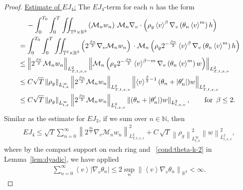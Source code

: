 \documentclass[11pt,american, reqno]{amsart}
\numberwithin{equation}{section}
\newcommand{\N}{\mathbb N}
\newcommand{\R}{\mathbb R}
\newcommand{\1}{\mathds{1}}
\newcommand{\Ni}{\noindent}
\newcommand{\CalM}{\mathcal{M}}
\newcommand{\vpran}[1]{\left(#1\right)}
\newcommand{\norm}[1]{\left\lVert#1\right\rVert}
\newcommand{\abs}[1]{\left\vert#1\right\vert}
\newcommand{\vint}[1]{\left\langle#1\right\rangle}
\newcommand{\T}{\mathbb{T}}
\numberwithin{equation}{section}
\begin{document}
\begin{proof}
\Ni \underline{Estimate of $EJ_4$:} The $EJ_4$-term for each $n$ has the form
\begin{align*}
& \quad \,
 - \int_0^{T_0} \int_0^T \iint_{\T^3 \times \R^3}
   \vpran{\CalM_n w_n} \,
  \CalM_n \nabla_v \cdot 
    \vpran{\rho_g \vint{v}^\beta
    \nabla_v\vpran{\theta_n \vint{v}^m} h} 
\\
& = \int_0^{T_0} \int_0^T \iint_{\T^3 \times \R^3}
   \vpran{2^{\frac{\beta n}{2}}\nabla_ v\CalM_n w_n} \, \cdot
  \CalM_n 
    \vpran{\rho_g 2^{-\frac{\beta n}{2}}\vint{v}^\beta
    \nabla_v\vpran{\theta_n \vint{v}^m} h} 
\\
& \leq 
 \norm{2^{\frac{\beta n}{2}}\CalM_n w_n}_{L^2_{T,t,x,v}}
 \norm{\CalM_n 
    \vpran{\rho_g 2^{-\frac{\beta n}{2}}\vint{v}^{\beta-m}
    \nabla_v\vpran{\theta_n \vint{v}^m} w}}_{L^2_{T,t,x,v}}
\\
& \leq
 C \sqrt{T} 
 \norm{\rho_g}_{L^\infty_{t,x}}
 \norm{2^{\frac{\beta n}{2}}\CalM_n w_n}_{L^2_{T,t,x,v}}
 \norm{\vint{v}^{\frac{\beta}{2}-1} (\theta_n + |\theta'_n|)
    w}_{L^2_{T,t,x,v}}
\\
& \leq
 C \sqrt{T} 
 \norm{\rho_g}_{L^\infty_{t,x}}
 \norm{2^{\frac{\beta n}{2}}\CalM_n w_n}_{L^2_{t,x,v}}
 \norm{(\theta_n + |\theta'_n|)
    w}_{L^2_{t,x,v}}, 
\qquad \text{for \,} \beta \leq 2.
\end{align*}
Similar as the estimate for $EJ_3$, if we sum over $n \in \N$, then
\begin{align} \label{est:EJ-4}
 EJ_4
\leq
 \sqrt{T} \sum_{n=0}^\infty
 \norm{2^{\frac{\beta n}{2}} \nabla_v \CalM_n w_n}_{L^2_{T,t,x,v}}^2
 + C \, \sqrt{T} \norm{\rho_g}_{L^\infty_{t,x}}^2
 \norm{w}_{L^2_{t,x,v}}^2,
\end{align}
where by the compact support on each ring and ~\eqref{cond:theta-k-2} in Lemma~\ref{lem:dyadic}, we have applied 
\begin{align*}
 \sum_{n=0}^\infty
 \vint{v} \abs{\nabla_v \theta_n} 
\leq 
 2 \sup_n \norm{\vint{v}\nabla_v \theta_n}_{\R^3} 
< \infty.
\end{align*}


\end{proof}
\end{document}
